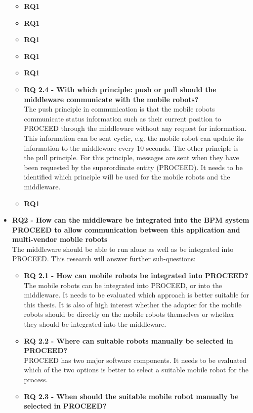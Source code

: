 \begin{itemize}
\begin{itemize}
     \item \textbf{RQ1}
     \item \textbf{RQ1}
     \item \textbf{RQ1}
     \item \textbf{RQ1}
     \item \textbf{RQ1}
     \item \textbf{RQ 2.4 - With which principle: push or pull should the middleware communicate with the mobile robots?} \hfill \\ 
The push principle in communication is that the mobile robots communicate status information such as their current position to PROCEED through the middleware without any request for information. This information can be sent cyclic, e.g. the mobile robot can update its information to the middleware every 10 seconds. The other principle is the pull principle. For this principle, messages are sent when they have been requested by the superordinate entity (PROCEED). It needs to be identified which principle will be used for the mobile robots and the middleware.
   \item \textbf{RQ1}
\end{itemize}
   \item \textbf{RQ2 - How can the middleware be integrated into the BPM system PROCEED to allow communication between this application and multi-vendor mobile robots} \hfill \\ 
The middleware should be able to run alone as well as be integrated into PROCEED. This research will answer further sub-questions:
   \begin{itemize}
     \item \textbf{RQ 2.1 - How can mobile robots be integrated into PROCEED?} \hfill \\ 
The mobile robots can be integrated into PROCEED, or into the middleware. It needs to be evaluated which approach is better suitable for this thesis. It is also of high interest whether the adapter for the mobile robots should be directly on the mobile robots themselves or whether they should be integrated into the middleware.
     \item \textbf{RQ 2.2 - Where can suitable robots manually be selected in PROCEED?} \hfill \\ 
PROCEED has two major software components. It needs to be evaluated which of the two options is better to select a suitable mobile robot for the process.
     \item \textbf{RQ 2.3 - When should the suitable mobile robot manually be selected in PROCEED?} \hfill \\ 

\end{itemize}
\end{itemize}
